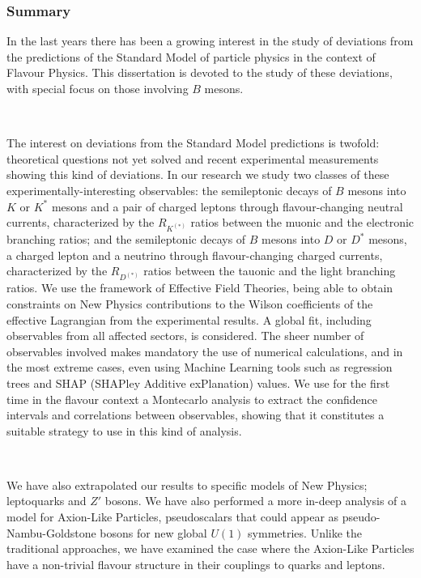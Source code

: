 \documentclass[mathserif, 10pt, dvipsnames]{beamer}
\begin{document}
\begin{frame}\frametitle{Summary}
    \scriptsize
    In the last years there has been a growing interest in the study of
    deviations from the predictions of the Standard Model of particle
    physics in the context of Flavour Physics. This dissertation is devoted
    to the study of these deviations, with special focus on those involving
    $B$ mesons.

    ~

    The interest on deviations from the Standard Model predictions is
    twofold: theoretical questions not yet solved and recent experimental
    measurements showing this kind of deviations. In our research we study
    two classes of these experimentally-interesting observables: the
    semileptonic decays of $B$ mesons into $K$ or $K^*$ mesons and a pair of
    charged leptons through flavour-changing neutral currents, characterized
    by the $R_{K^{(*)}}$ ratios between the muonic and the electronic branching
    ratios; and the semileptonic decays of $B$ mesons into $D$ or $D^*$ mesons, a
    charged lepton and a neutrino through flavour-changing charged currents,
    characterized by the $R_{D^{(*)}}$ ratios between the tauonic and the light
    branching ratios. We use the framework of Effective Field Theories,
    being able to obtain constraints on New Physics contributions to the
    Wilson coefficients of the effective Lagrangian from the experimental
    results. A global fit, including observables from all affected sectors,
    is considered. The sheer number of observables involved makes mandatory
    the use of numerical calculations, and in the most extreme cases, even
    using Machine Learning tools such as regression trees and SHAP (SHAPley
    Additive exPlanation) values. We use for the first time in the flavour
    context a Montecarlo analysis to extract the confidence intervals and
    correlations between observables, showing that it constitutes a suitable
    strategy to use in this kind of analysis.

    ~

    We have also extrapolated our results to specific models of New Physics;
    leptoquarks and $Z'$ bosons. We have also performed a more in-deep
    analysis of a model for Axion-Like Particles, pseudoscalars that could
    appear as pseudo-Nambu-Goldstone bosons for new global $U(1)$ symmetries.
    Unlike the traditional approaches, we have examined the case where the
    Axion-Like Particles have a non-trivial flavour structure in their
    couplings to quarks and leptons.
\end{frame}
\end{document}
